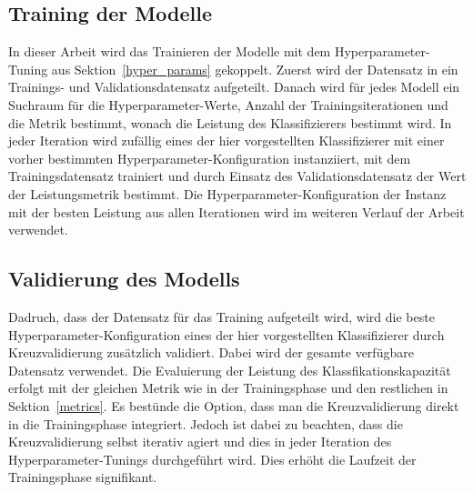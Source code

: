 \subsection*{Training der Modelle}
In dieser Arbeit wird das Trainieren der Modelle mit dem Hyperparameter-Tuning aus Sektion~\ref{hyper_params} gekoppelt. Zuerst wird der Datensatz in ein Trainings- und Validationsdatensatz aufgeteilt. Danach wird für jedes Modell ein Suchraum für die Hyperparameter-Werte, Anzahl der Trainingsiterationen und die Metrik bestimmt, wonach die Leistung des Klassifizierers
bestimmt wird. In jeder Iteration wird zufällig eines der hier vorgestellten Klassifizierer mit einer vorher bestimmten Hyperparameter-Konfiguration instanziiert, mit dem Trainingsdatensatz trainiert und durch Einsatz des Validationsdatensatz der Wert der Leistungsmetrik bestimmt. Die Hyperparameter-Konfiguration der Instanz mit der besten Leistung aus allen Iterationen wird im weiteren Verlauf der Arbeit verwendet.

\subsection*{Validierung des Modells}
Dadruch, dass der Datensatz für das Training aufgeteilt wird, wird die beste Hyperparameter-Konfiguration eines der hier vorgestellten Klassifizierer durch Kreuzvalidierung zusätzlich validiert.
Dabei wird der gesamte verfügbare Datensatz verwendet. Die Evaluierung der Leistung des Klassfikationskapazität erfolgt mit der gleichen Metrik wie in der Trainingsphase und den restlichen in Sektion~\ref{metrics}. Es bestünde die Option, dass man die Kreuzvalidierung direkt in die Trainingsphase integriert. 
Jedoch ist dabei zu beachten, dass die Kreuzvalidierung selbst iterativ agiert und dies in jeder Iteration des Hyperparameter-Tunings durchgeführt wird. Dies erhöht die Laufzeit der Trainingsphase signifikant.

